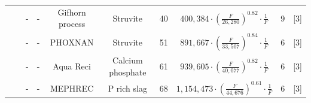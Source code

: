 \documentclass[authoryear]{elsarticle}
\begin{document}
\begin{table}[h]
{\begin{threeparttable}
\begin{tabular}{@{}cccccccccc@{}}
			&                                                                                                                                                         & -                                                                               & -                                     & Gifhorn process                                                                          & Struvite                                                                          & 40                                                                                    & $400,384 \cdot \left( \frac{F}{26,280} \right)^{0.82} \cdot \frac{1}{F}$                                    & 9                                                            &   [3]       \\
			&                                                                                                                                                         & -                                                                               & -                                     & PHOXNAN                                                                                  & Struvite                                                                          & 51                                                                                    & $891,667 \cdot \left( \frac{F}{33,507} \right)^{0.84} \cdot \frac{1}{F}$                                 & 6                                                            &    [3]      \\
			&                                                                                                                                                         & -                                                                               & -                                     & Aqua Reci                                                                                & Calcium phosphate                                                                 & 61                                                                                    & $939,605 \cdot \left( \frac{F}{40,077} \right)^{0.82} \cdot \frac{1}{F}$                                 & 6                                                            &    [3]      \\
			&                                                                                                                                                         & -                                                                               & -                                     & MEPHREC                                                                                  & P rich slag                                                                       & 68                                                                                    & $1,154,473 \cdot \left( \frac{F}{44,676} \right)^{0.61} \cdot \frac{1}{F}$                                 & 6                                                            &    [3]      \\ \cmidrule(l){2-10}

\end{tabular}
\end{threeparttable}}
\end{table}
\end{document}
